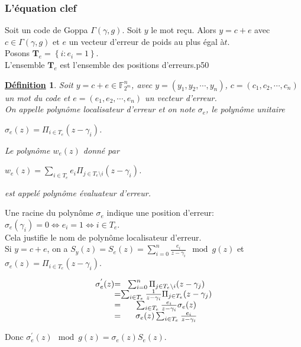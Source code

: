 \documentclass[12pt,openany]{report}
\newtheorem{definition}{\underline{Définition}}
\begin{document}
 \subsubsection{L'équation clef}
 Soit un code de Goppa $\Gamma(\gamma,g)$.
 Soit $y$ le mot reçu. Alors $y=c+e $ avec $ c \in \Gamma (\gamma,g)$ et $e$ un vecteur d'erreur de poids au plus égal à$t$.\\
 Posons $\mathbf{T}_e=\left\lbrace i:e_i=1 \right\rbrace  $.\\
 L'ensemble $\mathbf{T}_e $ est l'ensemble des positions d'erreurs.\cite{Ndollane}p50
 \begin{definition}
 Soit $y=c+e \in \mathbb{F}_{2^m}^n$, avec $y=(y_1,y_2,\cdots,y_n)$, $c=(c_1,c_2,\cdots,c_n)$ un mot du code et $e=(e_1,e_2,\cdots,e_n)$ un vecteur d'erreur.\\
 On appelle polynôme localisateur d'erreur et on note $\sigma_e$,\hspace{0.2cm} le polynôme unitaire
 \begin{center}
 $ \sigma_e(z)=\Pi_{i\in T_e}(z-\gamma_i) $.
 \end{center}
 Le polynôme $w_e(z)$ donné par 
  \begin{center}
 $ w_e(z)=\sum_{i\in T_e} e_i \Pi_{j\in T_e \setminus i }(z-\gamma_i) $.
 \end{center}
 est appelé polynôme évaluateur d'erreur.
 \end{definition}
 Une racine du polynôme $\sigma_e $ indique une position d'erreur:\\
 $\sigma_e(\gamma_i)=0 \Leftrightarrow e_i=1 \Leftrightarrow i \in T_e $.\\
 Cela justifie le nom de polynôme localisateur d'erreur.\\
 Si $y=c+e $, on a $\mathit{S}_y(z)=\mathit{S}_e(z)=\sum_{i=0}^{n} \frac{e_i}{z-\gamma_i}\mod g(z)  $ et $\sigma_e(z)=\Pi_{i \in T_e}(z-\gamma_i) $.
 \begin{center}
 \[
\left.
\begin{array}{c @{=} c}
     \sigma_e^{'}(z)&\sum_{i=0}^{n} \Pi_{j\in T_e \setminus i} (z-\gamma_j) \\
            &\sum_{i \in T_e} \frac{1}{ z-\gamma_i} \Pi_{j\in T_e} (z-\gamma_j ) \\
             &\sum_{i \in T_e} \frac{e_i}{ z-\gamma_i}\sigma_e(z) \\
             &\sigma_e(z) \sum_{i \in T_e} \frac{e_i}{ z-\gamma_i} 
\end{array}
\right.
\] 
            
 \end{center}
 Donc $\sigma_e^{'}(z) \mod g(z)=\sigma_e(z)\mathit{S}_e(z) $.
 
\end{document}
